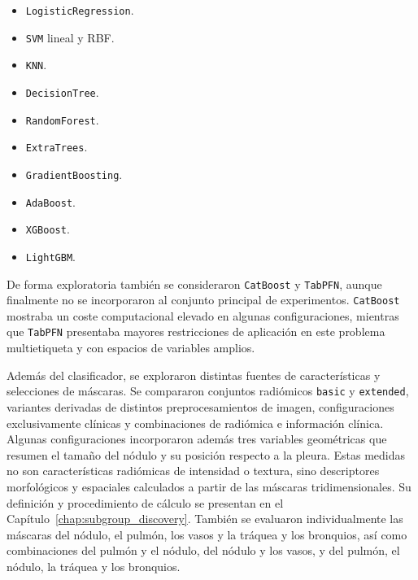 \begin{itemize}
    \item \texttt{LogisticRegression}.
    \item \texttt{SVM} lineal y RBF.
    \item \texttt{KNN}.
    \item \texttt{DecisionTree}.
    \item \texttt{RandomForest}.
    \item \texttt{ExtraTrees}.
    \item \texttt{GradientBoosting}.
    \item \texttt{AdaBoost}.
    \item \texttt{XGBoost}.
    \item \texttt{LightGBM}.
\end{itemize}

De forma exploratoria también se consideraron \texttt{CatBoost} y \texttt{TabPFN}, aunque finalmente no se incorporaron al conjunto principal de experimentos. \texttt{CatBoost} mostraba un coste computacional elevado en algunas configuraciones, mientras que \texttt{TabPFN} presentaba mayores restricciones de aplicación en este problema multietiqueta y con espacios de variables amplios.


Además del clasificador, se exploraron distintas fuentes de características y selecciones de máscaras. Se compararon conjuntos radiómicos \texttt{basic} y \texttt{extended}, variantes derivadas de distintos preprocesamientos de imagen, configuraciones exclusivamente clínicas y combinaciones de radiómica e información clínica. Algunas configuraciones incorporaron además tres variables geométricas que resumen el tamaño del nódulo y su posición respecto a la pleura. Estas medidas no son características radiómicas de intensidad o textura, sino descriptores morfológicos y espaciales calculados a partir de las máscaras tridimensionales. Su definición y procedimiento de cálculo se presentan en el Capítulo~\ref{chap:subgroup_discovery}. También se evaluaron individualmente las máscaras del nódulo, el pulmón, los vasos y la tráquea y los bronquios, así como combinaciones del pulmón y el nódulo, del nódulo y los vasos, y del pulmón, el nódulo, la tráquea y los bronquios.

